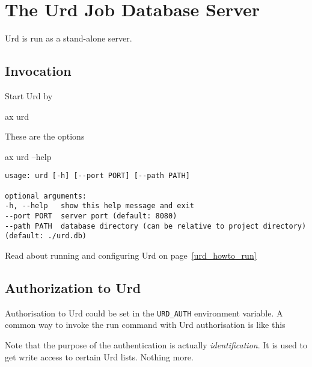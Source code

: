 \section{The Urd Job Database Server}
Urd is run as a stand-alone server.
\subsection{Invocation}
Start Urd by
\begin{shell}
ax urd
\end{shell}
These are the options
\begin{shell}
ax urd --help
\end{shell}
\begin{snugshade}
\begin{verbatim}
usage: urd [-h] [--port PORT] [--path PATH]

optional arguments:
-h, --help   show this help message and exit
--port PORT  server port (default: 8080)
--path PATH  database directory (can be relative to project directory)
(default: ./urd.db)
\end{verbatim}
\end{snugshade}
Read about running and configuring Urd on page~\ref{urd_howto_run}



\subsection{Authorization to Urd}
Authorisation to Urd could be set in the \texttt{URD\_AUTH}
environment variable.  A common way to invoke the run command with Urd
authorisation is like this
\begin{shell}
\end{shell}
Note that the purpose of the authentication is
actually \textsl{identification}.  It is used to get write access to
certain Urd lists.  Nothing more.


